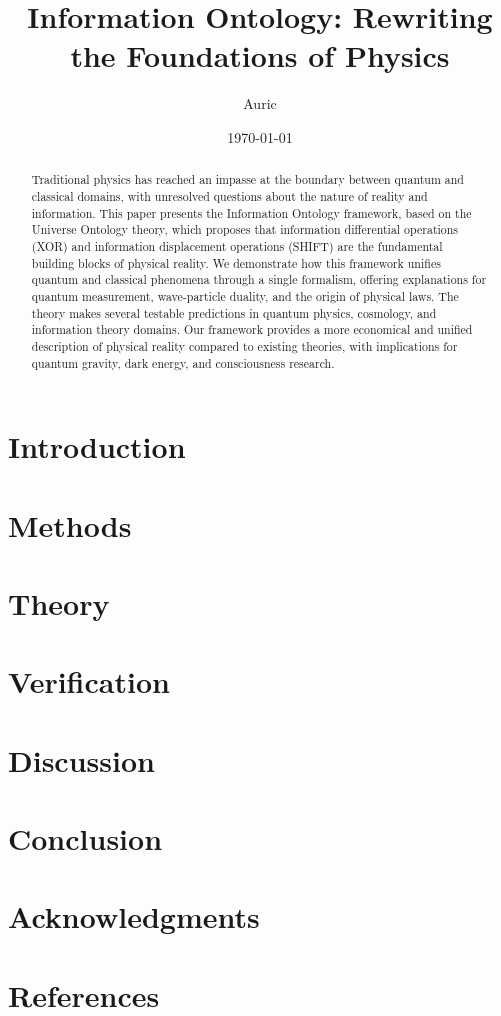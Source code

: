 \documentclass[12pt,letterpaper]{article}
\title{Information Ontology: Rewriting the Foundations of Physics}
\author[1]{Auric}
\affil[1]{Universe Ontology Research Group}
\date{\today}
\begin{document}
\maketitle

\begin{abstract}
Traditional physics has reached an impasse at the boundary between quantum and classical domains, with unresolved questions about the nature of reality and information. This paper presents the Information Ontology framework, based on the Universe Ontology theory, which proposes that information differential operations (XOR) and information displacement operations (SHIFT) are the fundamental building blocks of physical reality. We demonstrate how this framework unifies quantum and classical phenomena through a single formalism, offering explanations for quantum measurement, wave-particle duality, and the origin of physical laws. The theory makes several testable predictions in quantum physics, cosmology, and information theory domains. Our framework provides a more economical and unified description of physical reality compared to existing theories, with implications for quantum gravity, dark energy, and consciousness research.
\end{abstract}

\section{Introduction}


\section{Methods}


\section{Theory}


\section{Verification}



\section{Discussion}


\section{Conclusion}


\section*{Acknowledgments}


\section*{References}

\end{document}
